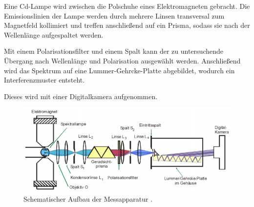 Eine Cd-Lampe wird zwischen die Polschuhe eines Elektromagneten gebracht. Die Emissionslinien der Lampe werden durch mehrere Linsen transversal
zum Magnetfeld kollimiert und treffen anschließend auf ein Prisma, sodass sie nach der Wellenlänge aufgespaltet werden.

Mit einem Polarisationsfilter und einem Spalt kann der zu untersuchende Übergang nach Wellenlänge und Polarisation
ausgewählt werden. Anschließend wird das Spektrum auf eine Lummer-Gehrcke-Platte abgebildet, wodurch ein Interferenzmuster
entsteht.

Dieses wird mit einer Digitalkamera aufgenommen.

\begin{figure}
\centering
\includegraphics[width=\textwidth]{zeemanaufbau.png}
\caption{Schematischer Aufbau der Messapparatur \cite[2]{anleitung}.}
\label{fig:aufbau}
\end{figure}
